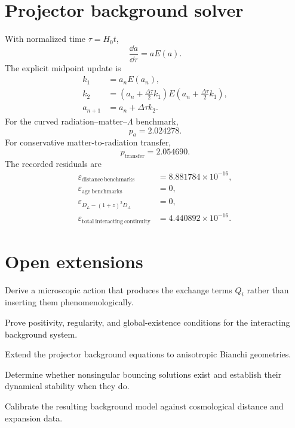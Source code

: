\section{Projector background solver}
With normalized time \(\tau=H_0t\),
\begin{equation}
\frac{\dd a}{\dd\tau}=aE(a).
\end{equation}
The explicit midpoint update is
\begin{align}
k_1&=a_nE(a_n),\\
k_2&=\left(a_n+\frac{\Delta\tau}{2}k_1\right)
E\left(a_n+\frac{\Delta\tau}{2}k_1\right),\\
a_{n+1}&=a_n+\Delta\tau k_2.
\end{align}
For the curved radiation--matter--\(\Lambda\) benchmark,
\begin{equation}
p_a=2.024278.
\end{equation}
For conservative matter-to-radiation transfer,
\begin{equation}
p_{\mathrm{transfer}}=2.054690.
\end{equation}
The recorded residuals are
\begin{align}
\varepsilon_{\mathrm{distance\ benchmarks}}
&=8.881784\times10^{-16},\\
\varepsilon_{\mathrm{age\ benchmarks}}
&=0,\\
\varepsilon_{D_L-(1+z)^2D_A}
&=0,\\
\varepsilon_{\mathrm{total\ interacting\ continuity}}
&=4.440892\times10^{-16}.
\end{align}

\section{Open extensions}
\begin{nextsteps}
\item Derive a microscopic action that produces the exchange terms \(Q_i\) rather than inserting them phenomenologically.
\item Prove positivity, regularity, and global-existence conditions for the interacting background system.
\item Extend the projector background equations to anisotropic Bianchi geometries.
\item Determine whether nonsingular bouncing solutions exist and establish their dynamical stability when they do.
\item Calibrate the resulting background model against cosmological distance and expansion data.
\end{nextsteps}
